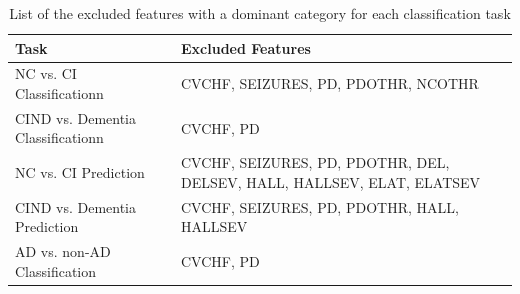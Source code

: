 \begin{table}[H]
    \centering
    \caption{List of the excluded features with a dominant category for each classification task}
    \begin{tabularx}{\textwidth}{|C|C|}
    \hline
        Task & Excluded Features \\ \hline
        NC vs. CI Classificationn & CVCHF, SEIZURES, PD, PDOTHR, NCOTHR \\ \hline
        CIND vs. Dementia Classificationn & CVCHF, PD \\ \hline
        NC vs. CI Prediction & CVCHF, SEIZURES, PD, PDOTHR, DEL, DELSEV, HALL, HALLSEV, ELAT, ELATSEV \\ \hline
        CIND vs. Dementia Prediction & CVCHF, SEIZURES, PD, PDOTHR, HALL, HALLSEV \\ \hline
        AD vs. non-AD Classification & CVCHF, PD \\ \hline
    \end{tabularx}
    \label{table:excluded-dominant-features}
\end{table}


